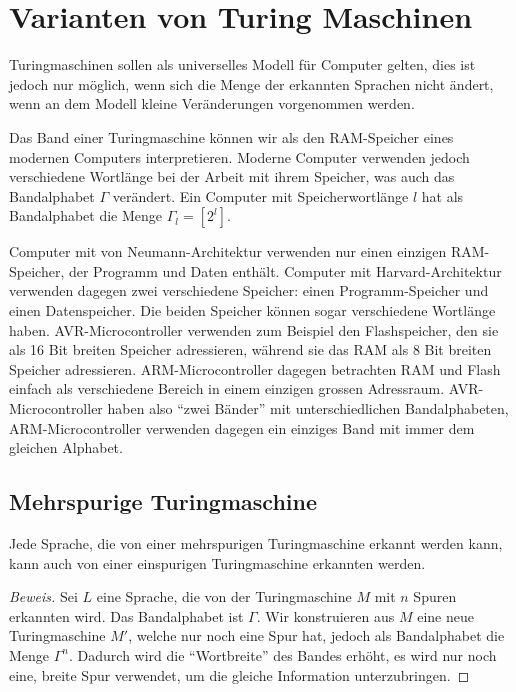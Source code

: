 %
%
%
\section{Varianten von Turing Maschinen}
Turingmaschinen sollen als universelles Modell für Computer gelten,
dies ist jedoch nur möglich, wenn sich die Menge der erkannten Sprachen
nicht ändert, wenn an dem Modell kleine Veränderungen vorgenommen
werden.

Das Band einer Turingmaschine können wir als den RAM-Speicher
eines modernen Computers interpretieren. Moderne Computer verwenden
jedoch verschiedene Wortlänge bei der Arbeit mit ihrem Speicher,
was auch das Bandalphabet $\Gamma$ verändert. Ein Computer mit
Speicherwortlänge $l$ hat als Bandalphabet die Menge $\Gamma_l=[2^l]$.

%
%
Computer mit von Neumann-Architektur verwenden nur einen einzigen RAM-Speicher,
der Programm und Daten enthält. Computer mit Harvard-Architektur
verwenden dagegen zwei verschiedene Speicher: einen Programm-Speicher
und einen Datenspeicher. Die beiden Speicher können sogar verschiedene
Wortlänge haben. AVR-Microcontroller verwenden zum Beispiel
den Flashspeicher, den sie als 16 Bit breiten Speicher adressieren,
während sie das RAM als 8 Bit breiten Speicher adressieren.
ARM-Microcontroller dagegen betrachten RAM und Flash einfach als
verschiedene Bereich in einem einzigen grossen Adressraum.
AVR-Microcontroller haben also ``zwei Bänder'' mit unterschiedlichen
Bandalphabeten, ARM-Microcontroller verwenden dagegen ein einziges Band
mit immer dem gleichen Alphabet.

\subsection{Mehrspurige Turingmaschine}
%
\begin{satz}\label{mehrspurigeturingmaschine}
Jede Sprache, die von einer mehrspurigen Turingmaschine
erkannt werden kann, kann auch von einer einspurigen Turingmaschine
erkannten werden.
\end{satz}

\begin{proof}[Beweis]
Sei $L$ eine Sprache, die von der Turingmaschine $M$ mit $n$ Spuren
erkannten wird. Das Bandalphabet ist $\Gamma$. Wir konstruieren aus
$M$ eine neue Turingmaschine $M'$, welche nur noch eine Spur hat,
jedoch als Bandalphabet die Menge $\Gamma^n$. Dadurch wird die ``Wortbreite''
des Bandes erhöht, es wird nur noch eine, breite Spur verwendet, um die
gleiche Information unterzubringen.
\end{proof}

